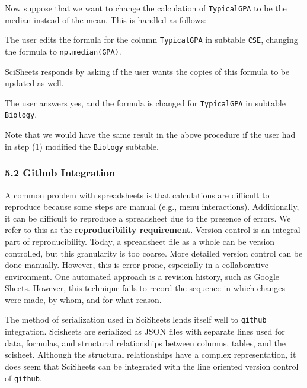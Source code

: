 \documentclass[letterpaper,compsoc,twoside]{IEEEtran}
\begin{document}
Now suppose that we want to change the calculation of
\texttt{TypicalGPA} to be the median instead of the mean.
This is handled as follows:\setcounter{listcnt0}{0}
\begin{list}{.}
{
\setlength{\rightmargin}{\leftmargin}
}

\item 

The user edits the formula for the column \texttt{TypicalGPA} in
subtable \texttt{CSE},
changing the formula to
\texttt{np.median(GPA)}.
\item 

SciSheets responds by asking if the user wants the
copies of this formula
to be updated as well.
\item 

The user answers \textquotedbl{}yes\textquotedbl{}, and the formula is changed for
\texttt{TypicalGPA} in subtable \texttt{Biology}.\end{list}


Note that we would have the same result in the above procedure
if the user had in step (1) modified the \texttt{Biology} subtable.

\subsubsection{5.2 Github Integration%
  \label{github-integration}%
}


A common problem with spreadsheets is that calculations are difficult to reproduce
because some steps are manual (e.g., menu interactions). Additionally, it can be
difficult to reproduce a spreadsheet due to the presence of errors.
We refer to this as the \textbf{reproducibility requirement}.
Version control is an integral part of reproducibility.
Today, a spreadsheet file as a whole can be version controlled,
but this granularity is too coarse.
More detailed version control can be done manually.
However, this is error prone, especially
in a collaborative environment.
One automated approach is a revision history, such as
Google Sheets.
However, this technique fails to record the sequence in which changes were made, by whom,
and for what reason.

The method of serialization used in SciSheets lends itself well
to \texttt{github} integration.
Scisheets are serialized as JSON files with separate lines used for data, formulas,
and structural relationships between columns, tables, and the scisheet.
Although the structural relationships have a complex representation, it
does seem that SciSheets can be integrated with the line oriented version
control of \texttt{github}.
\end{document}
